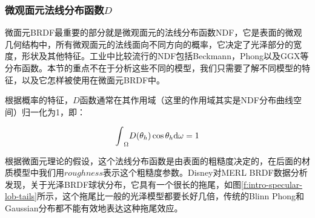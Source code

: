 \subsubsection{微观面元法线分布函数$D$}
微面元BRDF最重要的部分就是微观面元的法线分布函数NDF，它是表面的微观几何结构中，所有微观面元的法线面向不同方向的概率，它决定了光泽部分的宽度，形状及其他特征。工业中比较流行的NDF包括Beckmann\cite{a:TheScatteringofElectromagneticWavesfromRoughSurfaces}，Phong\cite{a:IlluminationforComputerGeneratedPictures}以及GGX\cite{a:Microfacetmodelsforrefractionthroughroughsurfaces}等分布函数。本节的重点不在于分析这些不同的模型，我们只需要了解不同模型的特征，以及它怎样被使用在微面元BRDF中。


根据概率的特征，$D$函数通常在其作用域（这里的作用域其实是NDF分布曲线空间）归一化为1，即：

\begin{equation}
	{\rm \int}_\Omega D(\theta_h)\cos\theta_h {\rm d}\omega =1
\end{equation}

根据微面元理论的假设，这个法线分布函数是由表面的粗糙度决定的，在后面的材质模型中我们用$roughness$表示这个粗糙度参数。Disney对MERL BRDF\cite{a:AData-DrivenReflectanceModel}数据分析发现，关于光泽BRDF球状分布，它具有一个很长的拖尾，如图\ref{f:intro-specular-lob-tails}所示，这个拖尾比一般的光泽模型都要长好几倍，传统的Blinn Phong和Gaussian分布都不能有效地表达这种拖尾效应。

